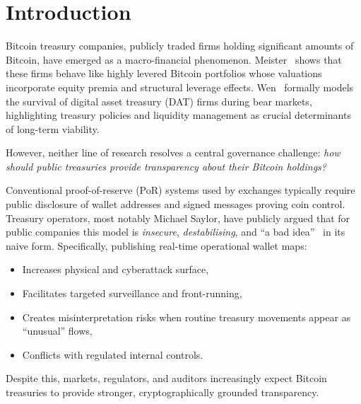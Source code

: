 \documentclass[11pt]{article}
\begin{document}
\section{Introduction}

Bitcoin treasury companies, publicly traded firms holding significant amounts of Bitcoin, have emerged as a macro-financial phenomenon. Meister~\cite{Meister2025} shows that these firms behave like highly levered Bitcoin portfolios whose valuations incorporate equity premia and structural leverage effects. Wen~\cite{Wen2025} formally models the survival of digital asset treasury (DAT) firms during bear markets, highlighting treasury policies and liquidity management as crucial determinants of long-term viability.

However, neither line of research resolves a central governance challenge: \emph{how should public treasuries provide transparency about their Bitcoin holdings?}

Conventional proof-of-reserve (PoR) systems used by exchanges typically require public disclosure of wallet addresses and signed messages proving coin control. Treasury operators, most notably Michael Saylor, have publicly argued that for public companies this model is \emph{insecure}, \emph{destabilising}, and ``a bad idea''~\cite{Saylor2025} in its naive form. Specifically, publishing real-time operational wallet maps:

\begin{itemize}[noitemsep]
\item Increases physical and cyberattack surface,
\item Facilitates targeted surveillance and front-running,
\item Creates misinterpretation risks when routine treasury movements appear as ``unusual'' flows,
\item Conflicts with regulated internal controls.
\end{itemize}

Despite this, markets, regulators, and auditors increasingly expect Bitcoin treasuries to provide stronger, cryptographically grounded transparency.
\end{document}
